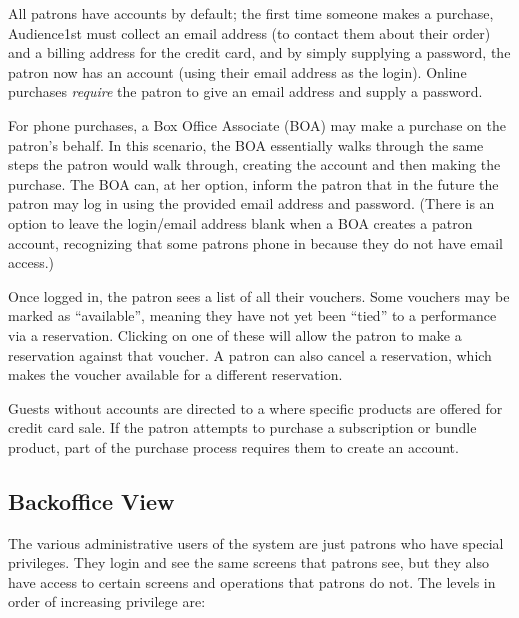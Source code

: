 All patrons have accounts by default; the first time someone makes a
purchase, Audience1st must collect an email address (to contact them
about their order) and a billing address for the credit card, and by
simply supplying a password, the patron now has an account (using their
email address as the login).  Online purchases \emph{require} the patron
to give an email address and supply a password.

For phone purchases, a Box Office Associate (BOA) may make a purchase on
the patron's behalf.  In this scenario, the BOA essentially walks
through the same steps the patron would walk through, creating the
account and then making the purchase.  The BOA can, at her option,
inform the patron that in the future the patron  may log in using the
provided email address and password.  (There is an option to leave the
login/email address blank when a BOA creates a patron account,
recognizing that some patrons phone in because they do not have email
access.) 

Once logged in, the patron sees a list of all their vouchers.  Some
vouchers may be marked as ``available'', meaning they have not yet been
``tied'' to a performance via a reservation.  Clicking on one of these
will allow the patron to make a reservation against that voucher.
A patron can also cancel a reservation, which makes the voucher
available for a different reservation.

Guests without accounts are directed to a  where specific
products are offered for credit card sale.  If the patron attempts to
purchase a subscription or bundle product, part of the purchase process
requires them to create an account.

\subsection{Backoffice View}

The various administrative users of the system are just patrons who have
special privileges.  They login and see the same screens that patrons
see, but they also have access to certain screens and operations that
patrons do not.  The levels in order of increasing privilege are:

